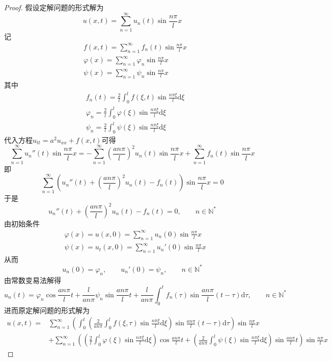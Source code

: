 \documentclass[lang = cn, scheme = chinese, thmcnt = section]{elegantbook}
\newcommand{\N}{\mathbb{N}}            %
\newcommand{\dd}{\mathrm{d}}           %
\begin{document}
\begin{proof}
	假设定解问题的形式解为
	$$
	u(x,t)=\sum_{n=1}^{\infty}u_n(t)\sin\frac{n\pi}{l}x
	$$
	记
	\begin{align*}
		& f(x,t)=\sum_{n=1}^{\infty}f_n(t)\sin\frac{n\pi}{l}x\\
		& \varphi(x)=\sum_{n=1}^{\infty}\varphi_n\sin\frac{n\pi}{l}x\\
		& \psi(x)=\sum_{n=1}^{\infty}\psi_n\sin\frac{n\pi}{l}x
	\end{align*}
	其中
	\begin{align*}
		& f_n(t)=\frac{2}{l}\int_0^lf(\xi,t)\sin\frac{n\pi \xi}{l}\dd \xi\\
		& \varphi_n=\frac{2}{l}\int_0^l\varphi(\xi)\sin\frac{n\pi \xi}{l}\dd \xi\\
		& \psi_n=\frac{2}{l}\int_0^l\psi(\xi)\sin\frac{n\pi \xi}{l}\dd \xi
	\end{align*}
	代入方程$u_{tt}=a^2u_{xx}+f(x,t)$可得
	$$
	\sum_{n=1}^{\infty}u_n''(t)\sin\frac{n\pi}{l}x
	=-\sum_{n=1}^{\infty}\left(\frac{an\pi}{l}\right)^2u_n(t)\sin\frac{n\pi}{l}x+\sum_{n=1}^{\infty}f_n(t)\sin\frac{n\pi}{l}x
	$$
	即
	$$
	\sum_{n=1}^{\infty}\left( u_n''(t)+\left(\frac{an\pi}{l}\right)^2u_n(t)-f_n(t) \right)\sin\frac{n\pi}{l}x=0
	$$
	于是
	$$
	u_n''(t)+\left(\frac{an\pi}{l}\right)^2u_n(t)-f_n(t)=0,\qquad 
	n\in\N^*
	$$
	由初始条件
	\begin{align*}
		& \varphi(x)=u(x,0)=\sum_{n=1}^{\infty}u_n(0)\sin\frac{n\pi}{l}x\\
		& \psi(x)=u_t(x,0)=\sum_{n=1}^{\infty}u_n'(0)\sin\frac{n\pi}{l}x
	\end{align*}
	从而
	$$
	u_n(0)=\varphi_n,\qquad 
	u_n'(0)=\psi_n,\qquad n\in\N^*
	$$
	由常数变易法解得
	$$
	u_n(t)=\varphi_n\cos\frac{an\pi}{l}t+\frac{l}{an\pi}\psi_n\sin\frac{an\pi}{l}t+\frac{l}{an\pi}\int_{0}^{t}f_n(\tau)\sin\frac{an\pi}{l}(t-\tau)\dd \tau,\qquad n\in\N^*
	$$
	进而原定解问题的形式解为
	\begin{align*}
		u(x,t)
		= & \sum_{n=1}^{\infty}\left(\int_{0}^{t}\left(\frac{2}{an\pi}\int_0^lf(\xi,\tau)\sin\frac{n\pi \xi}{l}\dd \xi\right)\sin \frac{an\pi}{l}(t-\tau)\dd \tau\right)\sin\frac{n\pi}{l}x\\
		& + \sum_{n=1}^{\infty}\left(\left(\frac{2}{l}\int_0^l\varphi(\xi)\sin\frac{n\pi \xi}{l}\dd \xi\right)\cos\frac{an\pi}{l}t+\left(\frac{2}{an\pi}\int_0^l\psi(\xi)\sin\frac{n\pi \xi}{l}\dd \xi\right)\sin \frac{an\pi}{l}t\right)\sin\frac{n\pi}{l}x
	\end{align*}
\end{proof}
\end{document}
